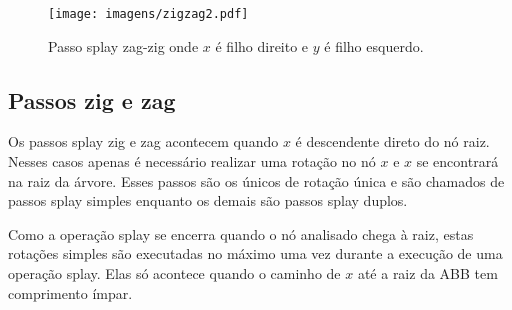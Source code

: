 {\begin{figure}[H]
\begin{comment}
        \begin{scope}[xshift=6cm, local bounding box=scope2]
            \Tree [.$z$  [.$x$ [.$y$ \node[alpha]{a}; \node[alpha]{b}; ] \node[alpha]{c};] \node[alpha]{d};]
            \end{scope}
            
            \begin{scope}[xshift=12cm, local bounding box=scope3]
                \Tree [.$x$ [.$y$ \node[alpha]{a}; \node[alpha]{b};] [.$z$  \node[alpha]{c}; \node[alpha]{d};]]
            \end{scope}
                
            \draw[->] ([yshift=-0.5*\ht\strutbox,xshift=0.3cm]scope2.east) -- node [n] {} ([yshift=-0.5*\ht\strutbox,xshift=-0.3cm]scope3.west);
                
            \draw[->] ([yshift=-3.67cm, xshift=0.67cm]scope2.north) arc (-18:198:0.7cm);
                \draw[->,red] ([yshift=-3.69cm, xshift=-0.82cm]scope2.north) arc (198:-18:0.86cm);
                
    \end{tikzpicture}
    \end{comment}
    \texttt{[image: imagens/zigzag2.pdf]}
\caption{Passo splay zag-zig onde $x$ é filho direito e $y$ é filho esquerdo.}
\end{figure}
        
}

\subsection{Passos zig e zag}

Os passos splay zig e zag acontecem quando $x$ é descendente direto do nó raiz. Nesses casos apenas é necessário realizar uma rotação no nó $x$ e $x$ se encontrará na raiz da árvore. Esses passos são os únicos de rotação única e são chamados de passos splay simples enquanto os demais são passos splay duplos.

Como a operação splay se encerra quando o nó analisado chega à raiz, estas rotações simples são executadas no máximo uma vez durante a execução de uma operação splay. Elas só acontece quando o caminho de $x$ até a raiz da ABB tem comprimento ímpar.

